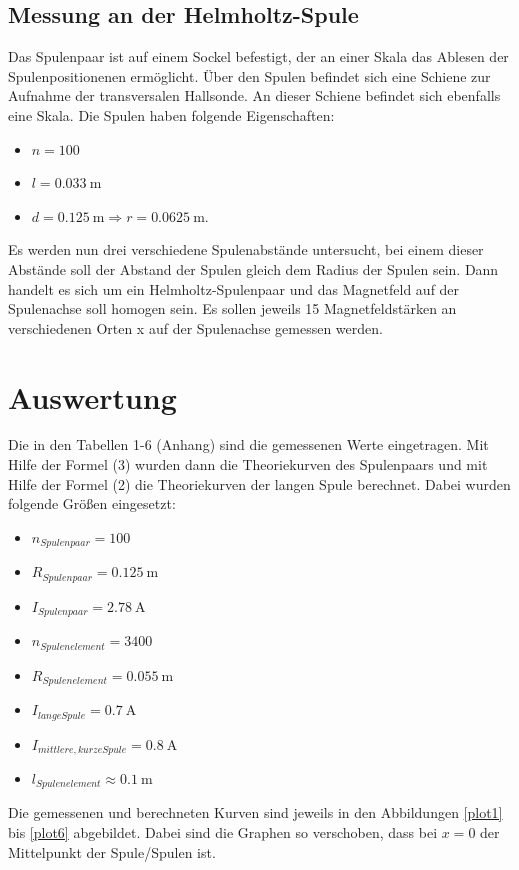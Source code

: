 \documentclass[11pt,ngerman,a4paper]{article}
\begin{document}
\subsection{Messung an der Helmholtz-Spule}
Das Spulenpaar ist auf einem Sockel befestigt, der an einer Skala das Ablesen der Spulenpositionenen ermöglicht. Über den Spulen befindet sich eine Schiene zur Aufnahme der transversalen Hallsonde. An dieser Schiene befindet sich ebenfalls eine Skala. Die Spulen haben folgende Eigenschaften:
\begin{itemize}
\item $n = 100$
\item $l = \SI{0.033}{\meter}$
\item $d = \SI{0.125}{\meter} \Rightarrow r =  \SI{0.0625}{\meter} $.
\end{itemize}
Es werden nun drei verschiedene Spulenabstände untersucht, bei einem dieser Abstände soll der Abstand der Spulen gleich dem Radius der Spulen sein. Dann handelt es sich um ein Helmholtz-Spulenpaar und das Magnetfeld auf der Spulenachse soll homogen sein. Es sollen jeweils 15 Magnetfeldstärken an verschiedenen Orten x auf der Spulenachse gemessen werden.

\section{Auswertung}
Die in den Tabellen 1-6 (Anhang) sind die gemessenen Werte eingetragen. Mit Hilfe der Formel (3) wurden dann die Theoriekurven des Spulenpaars und mit Hilfe der Formel (2) die Theoriekurven der langen Spule berechnet. Dabei wurden folgende Größen eingesetzt:
\begin{itemize}
\item $n_{Spulenpaar} = 100$
\item $R_{Spulenpaar} = \SI{0.125}{\meter}$
\item $I_{Spulenpaar} = \SI{2.78}{\ampere}$
\item $n_{Spulenelement} = 3400$
\item $R_{Spulenelement} = \SI{0.055}{\meter}$
\item $I_{lange Spule} = \SI{0.7}{\ampere}$
\item $I_{mittlere, kurze Spule} = \SI{0.8}{\ampere}$
\item $l_{Spulenelement} \approx \SI{0.1}{\meter}$
\end{itemize}
Die gemessenen und berechneten Kurven sind jeweils in den Abbildungen \ref{plot1} bis \ref{plot6} abgebildet. Dabei sind die Graphen so verschoben, dass bei $x=0$ der Mittelpunkt der Spule/Spulen ist.
\end{document}

